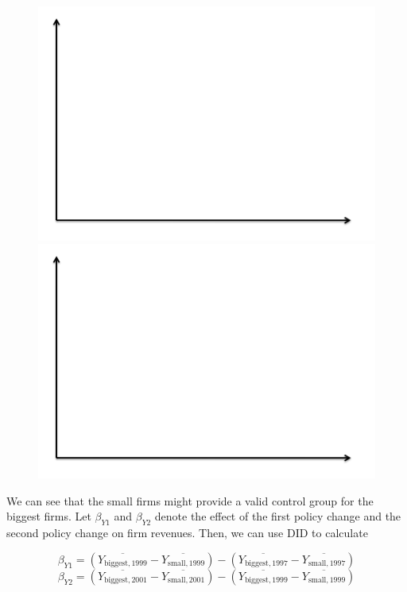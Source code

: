 \documentclass[12pt,english]{article}
\begin{document}
\begin{figure}[H]
	\begin{minipage}{.5\textwidth}
		\centering
		\includegraphics[width = \textwidth]{axes.png}
	\end{minipage}
	\begin{minipage}{.5\textwidth}
		\centering
		\includegraphics[width = \textwidth]{axes.png}
	\end{minipage}
\end{figure}

We can see that the small firms might provide a valid control group for the biggest firms. Let $\beta_{Y1}$ and $\beta_{Y2}$ denote the effect of the first policy change and the second policy change on firm revenues. Then, we can use DID to calculate

$$ \beta_{Y1} = \left( \overline{Y_{\text{biggest}, 1999}} - \overline{Y_{\text{small}, 1999}} \right) - \left( \overline{Y_{\text{biggest}, 1997}} - \overline{Y_{\text{small}, 1997}} \right) $$
$$ \beta_{Y2} = \left( \overline{Y_{\text{biggest}, 2001}} - \overline{Y_{\text{small}, 2001}} \right) - \left( \overline{Y_{\text{biggest}, 1999}} - \overline{Y_{\text{small}, 1999}} \right) $$
\end{document}
